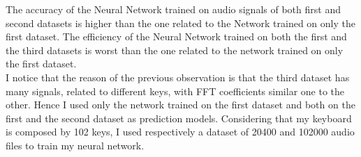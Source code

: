 The accuracy of the Neural Network trained on audio signals of both first and second datasets is higher than the one related to the Network trained on only the first dataset. The efficiency of the Neural Network trained on both the first and the third datasets is worst than the one related to the network trained on only the first dataset.\\
I notice that the reason of the previous observation is that the third dataset has many signals, related to different keys, with FFT coefficients similar one to the other. Hence I used only the network trained on the first dataset and both on the first and the second dataset as prediction models. Considering that my keyboard is composed by 102 keys, I used respectively a dataset of 20400 and 102000 audio files to train my neural network.

